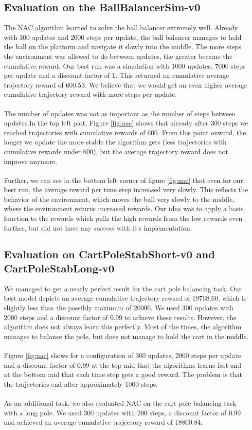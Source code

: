\subsection{Evaluation on the BallBalancerSim-v0}
The NAC algorithm learned to solve the ball balancer extremely well. Already with 300 updates and 2000 steps per update, the ball balancer manages to hold the ball on the platform and navigate it slowly into the middle. The more steps the environment was allowed to do between updates, the greater became the cumulative reward. Our best run was a simulation with 1000 updates, 7000 steps per update and a discount factor of 1. This returned an cumulative average trajectory reward of 600.53. We believe that we would get an even higher average cumulative trajectory reward with more steps per update.\\
\\
The number of updates was not as important as the number of steps between updates.In the top left plot, Figure \ref{fig:nac} shows that already after 300 steps we reached trajectories with cumulative rewards of 600. From this point onward, the longer we update the more stable the algorithm gets (less trajectories with cumulative rewards under 600), but the average trajectory reward does not improve anymore.\\
\\
Further, we can see in the bottom left corner of figure \ref{fig:nac} that even for our best run, the average reward per time step increased very slowly. This reflects the behavior of the environment, which moves the ball very slowly to the middle, where the environment returns increased rewards. Our idea was to apply a basis function to the rewards which pulls the high rewards from the low rewards even further, but did not have any success with it's implementation.

\subsection{Evaluation on CartPoleStabShort-v0 and CartPoleStabLong-v0}
We managed to get a nearly perfect result for the cart pole balancing task. Our best model depicts an average cumulative trajectory reward of 19768.60, which is slightly less than the possibly maximum of 20000. We used 300 updates with 2000 steps and a discount factor of 0.99 to achieve these results. However, the algorithm does not always learn this perfectly. Most of the times, the algorithm manages to balance the pole, but does not manage to hold the cart in the middle. \\
\\
Figure \ref{fig:nac} shows for a configuration of 300 updates, 2000 steps per update and a discount factor of 0.99  at the top mid that the algorithms learns fast and at the bottom mid that each time step gets a good reward. The problem is that the trajectories end after approximately 1000 steps.\\
\\
As an additional task, we also evaluated NAC on the cart pole balancing task with a long pole. We used 300 updates with 200 steps, a discount factor of 0.99 and achieved an average cumulative trajectory reward of 18800.84.

